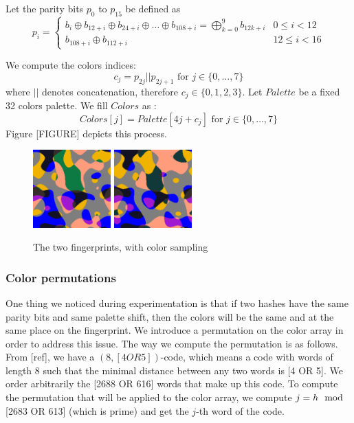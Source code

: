 \documentclass{article}
\begin{document}
Let the parity bits $p_0$ to $p_{15}$ be defined as 
\begin{equation*}
	p_i = \begin{cases} 
	    b_{i} \oplus b_{12+i} \oplus b_{24+i} \oplus \dots \oplus b_{108+i} = \bigoplus_{k=0}^9 b_{12k+i} & 0 \leq i < 12\\
	    b_{108 + i} \oplus b_{112 + i} & 12 \leq i < 16
	    \end{cases}
\end{equation*}

We compute the colors indices:
 $$c_j = p_{2j} || p_{2j+1} \text{ for } j \in \{0,\dotsc,7\}$$ where $||$ denotes concatenation, therefore $c_j \in \{0,1,2,3\}$.
 Let $Palette$ be a fixed 32 colors palette. We fill $Colors$ as :
$$Colors[j] = Palette[4j + c_j] \text{ for } j \in \{0, \dotsc, 7\}$$
Figure [FIGURE] depicts this process.

\begin{center}
\begin{figure}
    \centering
    \includegraphics[width=3cm]{figures/Colors.png}
    \hspace{3pt}
    \includegraphics[width=3cm]{figures/ColorsP67Psi02058.png}
    \caption{The two fingerprints, with color sampling}
    \label{fig:threeFuncsColor}
\end{figure}
\end{center}

\subsubsection{Color permutations}

One thing we noticed during experimentation is that if two hashes have the same parity bits and same palette shift, then the colors will be the same and at the same place on the fingerprint. We introduce a permutation on the color array in order to address this issue. The way we compute the permutation is as follows. From [ref], we have a $(8, [4 OR 5])$-code, which means a code with words of length 8 such that the minimal distance between any two words is [4 OR 5]. We order arbitrarily the [2688 OR 616] words that make up this code. To compute the permutation that will be applied to the color array, we compute $j = h \mod$ [2683 OR 613] (which is prime) and get the $j$-th word of the code.
\end{document}
